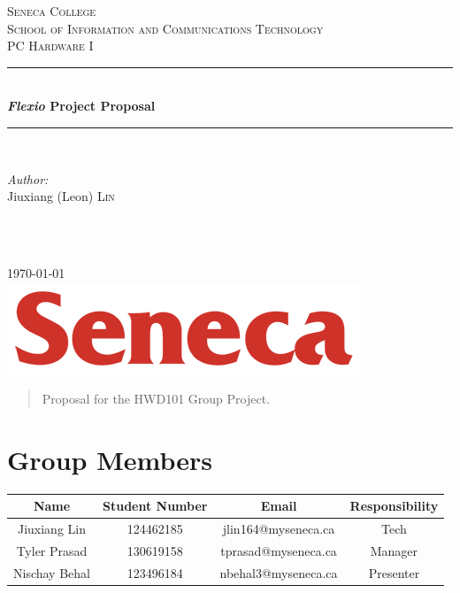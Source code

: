 \documentclass[12pt]{article}
\begin{document}
\begin{titlepage}

\newcommand{\HRule}{\rule{\linewidth}{0.5mm}}
\center
 
\textsc{\LARGE Seneca College}\\[1.5cm]
\textsc{\Large School of Information and Communications Technology}\\[0.5cm]
\textsc{\large PC Hardware I}\\[0.5cm]

\HRule \\[0.4cm]
{ \huge \bfseries \textit{Flexio} Project Proposal}\\[0.4cm]
\HRule \\[1.5cm]
 
\begin{minipage}{0.4\textwidth}
\begin{flushleft} \large
\emph{Author:}\\
Jiuxiang (Leon) \textsc{Lin}
\end{flushleft}
\end{minipage}
~
\begin{minipage}{0.4\textwidth}
\begin{flushright} \large
\end{flushright}
\end{minipage}\\[2cm]

{\large \today}\\[2cm]

\includegraphics{logo.png}\\[1cm]

\vfill

\end{titlepage}


\begin{abstract}
Proposal for the HWD101 Group Project.	
\end{abstract}

\section{Group Members}

\begin{tabular}{| c | c | c | c |}
\hline
\textbf{Name} & \textbf{Student Number} & \textbf{Email} & \textbf{Responsibility} \\\hline
Jiuxiang Lin & 124462185 & jlin164@myseneca.ca & Tech \\\hline
Tyler Prasad & 130619158 & tprasad@myseneca.ca & Manager \\\hline
Nischay Behal & 123496184 & nbehal3@myseneca.ca & Presenter \\\hline
\end{tabular}
\end{document}
